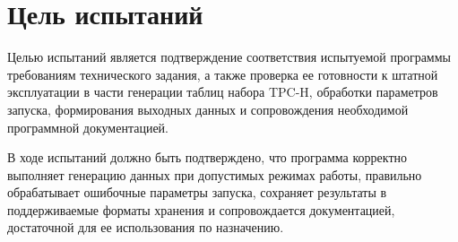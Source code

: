 \section{Цель испытаний}

Целью испытаний является подтверждение соответствия испытуемой программы
требованиям технического задания, а также проверка ее готовности к штатной
эксплуатации в части генерации таблиц набора TPC-H, обработки параметров
запуска, формирования выходных данных и сопровождения необходимой программной
документацией.

В ходе испытаний должно быть подтверждено, что программа корректно выполняет
генерацию данных при допустимых режимах работы, правильно обрабатывает
ошибочные параметры запуска, сохраняет результаты в поддерживаемые форматы
хранения и сопровождается документацией, достаточной для ее использования по
назначению.
